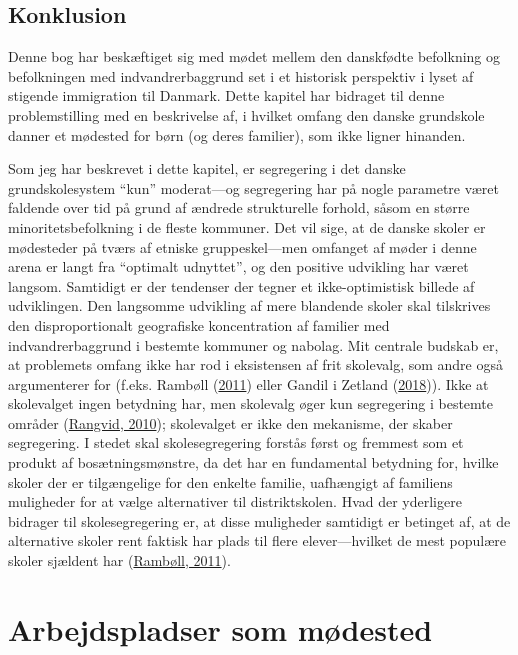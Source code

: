 \documentclass[
]{book}
\begin{document}
\hypertarget{konklusion}{%
\section{Konklusion}\label{konklusion}}

Denne bog har beskæftiget sig med mødet mellem den danskfødte befolkning og befolkningen med indvandrerbaggrund set i et historisk perspektiv i lyset af stigende immigration til Danmark. Dette kapitel har bidraget til denne problemstilling med en beskrivelse af, i hvilket omfang den danske grundskole danner et mødested for børn (og deres familier), som ikke ligner hinanden.

Som jeg har beskrevet i dette kapitel, er segregering i det danske grundskolesystem ``kun'' moderat---og segregering har på nogle parametre været faldende over tid på grund af ændrede strukturelle forhold, såsom en større minoritetsbefolkning i de fleste kommuner. Det vil sige, at de danske skoler er mødesteder på tværs af etniske gruppeskel---men omfanget af møder i denne arena er langt fra ``optimalt udnyttet'', og den positive udvikling har været langsom. Samtidigt er der tendenser der tegner et ikke-optimistisk billede af udviklingen. Den langsomme udvikling af mere blandende skoler skal tilskrives den disproportionalt geografiske koncentration af familier med indvandrerbaggrund i bestemte kommuner og nabolag. Mit centrale budskab er, at problemets omfang ikke har rod i eksistensen af frit skolevalg, som andre også argumenterer for (f.eks. Rambøll (\protect\hyperlink{ref-rambuxf8ll2011}{2011}) eller Gandil i Zetland (\protect\hyperlink{ref-zetland2018}{2018})). Ikke at skolevalget ingen betydning har, men skolevalg øger kun segregering i bestemte områder (\protect\hyperlink{ref-rangvid2010}{Rangvid, 2010}); skolevalget er ikke den mekanisme, der skaber segregering. I stedet skal skolesegregering forstås først og fremmest som et produkt af bosætningsmønstre, da det har en fundamental betydning for, hvilke skoler der er tilgængelige for den enkelte familie, uafhængigt af familiens muligheder for at vælge alternativer til distriktskolen. Hvad der yderligere bidrager til skolesegregering er, at disse muligheder samtidigt er betinget af, at de alternative skoler rent faktisk har plads til flere elever---hvilket de mest populære skoler sjældent har (\protect\hyperlink{ref-rambuxf8ll2011}{Rambøll, 2011}).

\hypertarget{kap4}{%
\chapter{Arbejdspladser som mødested}\label{kap4}}
\end{document}
